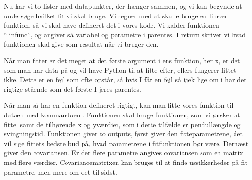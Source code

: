 \documentclass[letterpaper,10pt,english]{jupyterBook}
\begin{document}
\begin{sphinxVerbatim}[commandchars=\\\{\}]
  \PYG{p}{[}  \PYG{p}{]} 
  \PYG{p}{[}\PYG{p}{]} 

      

\end{sphinxVerbatim}

\begin{sphinxVerbatim}[commandchars=\\\{\}]
[0.19 0.3  0.36 0.53]
[2.0875 2.65   2.9675 3.61  ]
\end{sphinxVerbatim}

Nu har vi to lister med datapunkter, der hænger sammen, og vi kan begynde at undersøge hvilket fit vi skal bruge. Vi regner med at skulle bruge en lineær funktion, så vi skal have defineret det i vores kode. Vi kalder funktionen “linfunc”, og angiver så variabel og parametre i parentes. I return skriver vi hvad funktionen skal give som resultat når vi bruger den.

\begin{sphinxVerbatim}[commandchars=\\\{\}]
   
        
     
\end{sphinxVerbatim}

Når man fitter er det meget  at det første argument i ens funktion, her x, er det som man har data på og vil have Python til at fitte efter, ellers fungerer fittet ikke. Dette er en fejl som ofte opstår, så hvis I får en fejl så tjek lige om i har det rigtige stående som det første I jeres parentes.

Når man så har en funktion defineret rigtigt, kan man fitte vores funktion til dataen med kommandoen . Funktionen  skal bruge funktionen, som vi ønsker at fitte, samt de tilhørende x\sphinxhyphen{} og y\sphinxhyphen{}værdier, som i dette tilfælde er pendullængde og svingningstid. Funktionen giver to outputs, først giver den fitte\sphinxhyphen{}parametrene, det vil sige fittets bedste bud på, hvad parametrene i fit\sphinxhyphen{}funktionen bør være. Dernæst giver den covariansen. Er der flere parametre angives covariansen som en matrix med flere værdier. Covariance\sphinxhyphen{}matrixen kan bruges til at finde ussikkerheder på fit parametre, men mere om det til sidst.
\end{document}
